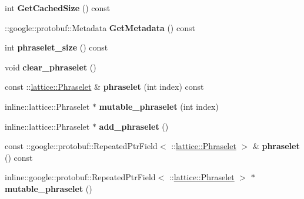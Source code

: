 \begin{DoxyCompactItemize}
\item 
\hypertarget{classlattice_1_1Phraselets_af6446f4c4dc198355a1a0baca9bf7bb2}{
int {\bfseries GetCachedSize} () const }
\label{classlattice_1_1Phraselets_af6446f4c4dc198355a1a0baca9bf7bb2}

\item 
\hypertarget{classlattice_1_1Phraselets_a904ffb151c7451ff5dd1c950bc84d54c}{
::google::protobuf::Metadata {\bfseries GetMetadata} () const }
\label{classlattice_1_1Phraselets_a904ffb151c7451ff5dd1c950bc84d54c}

\item 
\hypertarget{classlattice_1_1Phraselets_a53705111afb5bddd6370da7c86809681}{
int {\bfseries phraselet\_\-size} () const }
\label{classlattice_1_1Phraselets_a53705111afb5bddd6370da7c86809681}

\item 
\hypertarget{classlattice_1_1Phraselets_a380bfc60bcdb7de062b5ee48cead27c4}{
void {\bfseries clear\_\-phraselet} ()}
\label{classlattice_1_1Phraselets_a380bfc60bcdb7de062b5ee48cead27c4}

\item 
\hypertarget{classlattice_1_1Phraselets_a211ccfa16e63f8e8f94a37e34cf62995}{
const ::\hyperlink{classlattice_1_1Phraselet}{lattice::Phraselet} \& {\bfseries phraselet} (int index) const }
\label{classlattice_1_1Phraselets_a211ccfa16e63f8e8f94a37e34cf62995}

\item 
\hypertarget{classlattice_1_1Phraselets_ab9c74d12c2f7a1edd628556af8a8b3b5}{
inline::lattice::Phraselet $\ast$ {\bfseries mutable\_\-phraselet} (int index)}
\label{classlattice_1_1Phraselets_ab9c74d12c2f7a1edd628556af8a8b3b5}

\item 
\hypertarget{classlattice_1_1Phraselets_aee454d42c3235fb15fb28b1dd35927bc}{
inline::lattice::Phraselet $\ast$ {\bfseries add\_\-phraselet} ()}
\label{classlattice_1_1Phraselets_aee454d42c3235fb15fb28b1dd35927bc}

\item 
\hypertarget{classlattice_1_1Phraselets_aa3c9f5a4017d5c6a88dc65e283f98164}{
const ::google::protobuf::RepeatedPtrField$<$ ::\hyperlink{classlattice_1_1Phraselet}{lattice::Phraselet} $>$ \& {\bfseries phraselet} () const }
\label{classlattice_1_1Phraselets_aa3c9f5a4017d5c6a88dc65e283f98164}

\item 
\hypertarget{classlattice_1_1Phraselets_afbe87c3601feac1c66c56886e150e14b}{
inline::google::protobuf::RepeatedPtrField$<$ ::\hyperlink{classlattice_1_1Phraselet}{lattice::Phraselet} $>$ $\ast$ {\bfseries mutable\_\-phraselet} ()}
\label{classlattice_1_1Phraselets_afbe87c3601feac1c66c56886e150e14b}

\end{DoxyCompactItemize}
